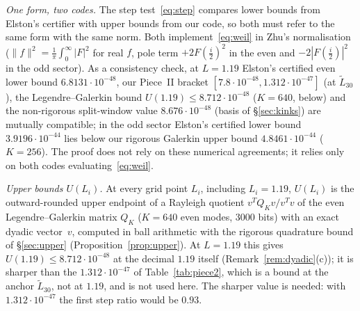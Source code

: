 \documentclass[11pt]{amsart}
\newcommand{\e}[1]{\cdot 10^{#1}}
\theoremstyle{definition}
\theoremstyle{remark}
\numberwithin{equation}{section}
\begin{document}
\emph{One form, two codes.} The step test~\eqref{eq:step} compares lower bounds from Elston's certifier with upper bounds from our code, so both must refer to the same form with the same norm. Both implement~\eqref{eq:weil} in Zhu's normalisation ($\|f\|^2=\frac1\pi\int_0^\infty|F|^2$ for real $f$, pole term $+2F(\tfrac i2)^2$ in the even and $-2|F(\tfrac i2)|^2$ in the odd sector). As a consistency check, at $L=1.19$ Elston's certified even lower bound $6.8131\e{-48}$, our Piece~II bracket $[7.8\e{-48},1.312\e{-47}]$ (at $\tilde L_{30}$), the Legendre--Galerkin bound $U(1.19)\le8.712\e{-48}$ ($K=640$, below) and the non-rigorous split-window value $8.676\e{-48}$ (basis of \S\ref{sec:kinks}) are mutually compatible; in the odd sector Elston's certified lower bound $3.9196\e{-44}$ lies below our rigorous Galerkin upper bound $4.8461\e{-44}$ ($K=256$). The proof does not rely on these numerical agreements; it relies only on both codes evaluating~\eqref{eq:weil}.

\emph{Upper bounds $U(L_i)$.} At every grid point $L_i$, including $L_i=1.19$, $U(L_i)$ is the outward-rounded upper endpoint of a Rayleigh quotient $v^TQ_Kv/v^Tv$ of the even Legendre--Galerkin matrix $Q_K$ ($K=640$ even modes, $3000$ bits) with an exact dyadic vector~$v$, computed in ball arithmetic with the rigorous quadrature bound of \S\ref{sec:upper} (Proposition~\ref{prop:upper}). At $L=1.19$ this gives $U(1.19)\le8.712\e{-48}$ at the decimal $1.19$ itself (Remark~\ref{rem:dyadic}(c)); it is sharper than the $1.312\e{-47}$ of Table~\ref{tab:piece2}, which is a bound at the anchor $\tilde L_{30}$, not at $1.19$, and is not used here. The sharper value is needed: with $1.312\e{-47}$ the first step ratio would be $0.93$.
\end{document}
